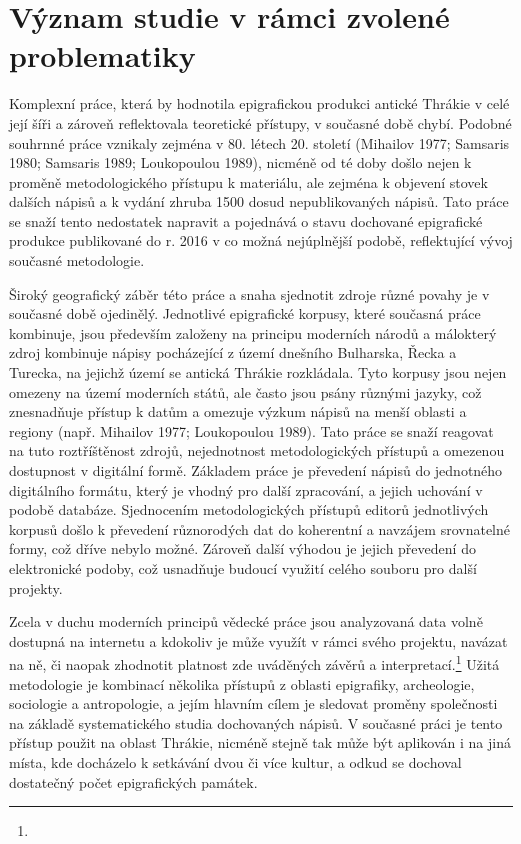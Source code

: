 
\section[význam-studie-v-rámci-zvolené-problematiky]{Význam studie v rámci zvolené problematiky}

Komplexní práce, která by hodnotila epigrafickou produkci antické Thrákie v celé její šíři a zároveň reflektovala teoretické přístupy, v současné době chybí. Podobné souhrnné práce vznikaly zejména v 80. létech 20. století (Mihailov 1977; Samsaris 1980; Samsaris 1989; Loukopoulou 1989), nicméně od té doby došlo nejen k proměně metodologického přístupu k materiálu, ale zejména k objevení stovek dalších nápisů a k vydání zhruba 1500 dosud nepublikovaných nápisů. Tato práce se snaží tento nedostatek napravit a pojednává o stavu dochované epigrafické produkce publikované do r. 2016 v co možná nejúplnější podobě, reflektující vývoj současné metodologie.

Široký geografický záběr této práce a snaha sjednotit zdroje různé povahy je v současné době ojedinělý. Jednotlivé epigrafické korpusy, které současná práce kombinuje, jsou především založeny na principu moderních národů a málokterý zdroj kombinuje nápisy pocházející z území dnešního Bulharska, Řecka a Turecka, na jejichž území se antická Thrákie rozkládala. Tyto korpusy jsou nejen omezeny na území moderních států, ale často jsou psány různými jazyky, což znesnadňuje přístup k datům a omezuje výzkum nápisů na menší oblasti a regiony (např. Mihailov 1977; Loukopoulou 1989). Tato práce se snaží reagovat na tuto roztříštěnost zdrojů, nejednotnost metodologických přístupů a omezenou dostupnost v digitální formě. Základem práce je převedení nápisů do jednotného digitálního formátu, který je vhodný pro další zpracování, a jejich uchování v podobě databáze. Sjednocením metodologických přístupů editorů jednotlivých korpusů došlo k převedení různorodých dat do koherentní a navzájem srovnatelné formy, což dříve nebylo možné. Zároveň další výhodou je jejich převedení do elektronické podoby, což usnadňuje budoucí využití celého souboru pro další projekty.

Zcela v duchu moderních principů vědecké práce jsou analyzovaná data volně dostupná na internetu a kdokoliv je může využít v rámci svého projektu, navázat na ně, či naopak zhodnotit platnost zde uváděných závěrů a interpretací.\footnote{\from[url1]} Užitá metodologie je kombinací několika přístupů z oblasti epigrafiky, archeologie, sociologie a antropologie, a jejím hlavním cílem je sledovat proměny společnosti na základě systematického studia dochovaných nápisů. V současné práci je tento přístup použit na oblast Thrákie, nicméně stejně tak může být aplikován i na jiná místa, kde docházelo k setkávání dvou či více kultur, a odkud se dochoval dostatečný počet epigrafických památek.

